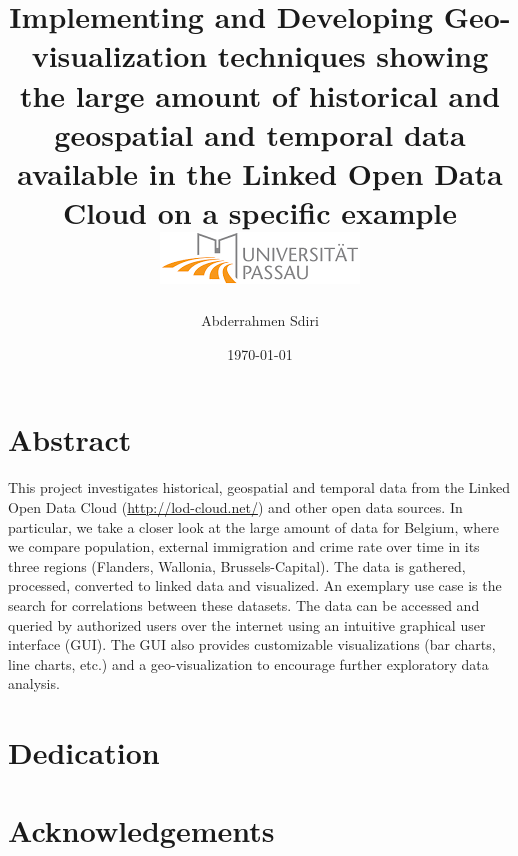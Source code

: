\documentclass[a4paper,12pt,oneside]{report}
\begin{document}
\title{
{ Implementing and Developing Geo-visualization techniques showing the large amount of historical and geospatial and temporal data available in the Linked Open Data Cloud on a specific example }\\
{\includegraphics{university.png}}}
\author{Abderrahmen Sdiri}
\date{\today}
\maketitle
\chapter*{Abstract}

This project investigates historical, geospatial and temporal data
from the Linked Open Data Cloud (\url{http://lod-cloud.net/}) and
other open data sources. In particular, we take a closer look at the
large amount of data for Belgium, where we compare population,
external immigration and crime rate over time in its three regions
(Flanders, Wallonia, Brussels-Capital). The data is gathered,
processed, converted to linked data and visualized. An exemplary use
case is the search for correlations between these datasets. The data
can be accessed and queried by authorized users over the internet
using an intuitive graphical user interface (GUI). The GUI also
provides customizable visualizations (bar charts, line charts, etc.)
and a geo-visualization to encourage further exploratory data
analysis.


\chapter*{Dedication}
\chapter*{Acknowledgements}
\tableofcontents
\listoffigures
\listoftables
\newpage
{}
\end{document}
